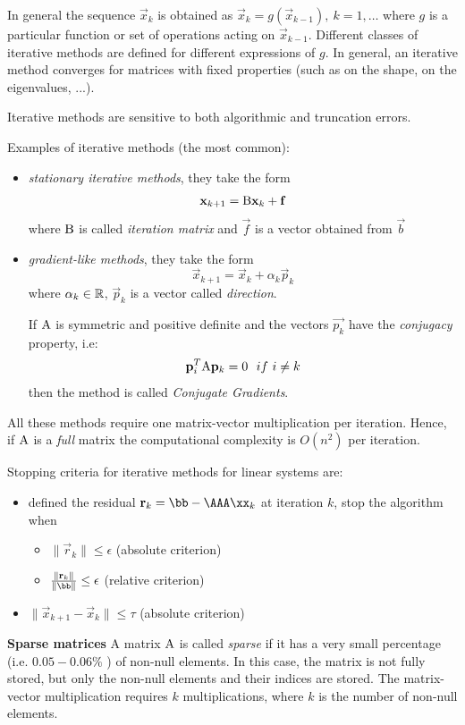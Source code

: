 In general the sequence $\vec{x}_k$ is obtained as $\vec{x}_k=g(\vec{x}_{k-1}), \ k=1,\ldots$ where $g$ is a particular function or set of operations acting on $\vec{x}_{k-1}$.
Different classes of iterative methods are defined for different expressions of $g$.
In general, an iterative method converges for matrices with fixed properties (such as on the shape, on the eigenvalues, ...).

Iterative methods are sensitive to both algorithmic and truncation errors.

Examples of iterative methods (the most common):

\begin{itemize}
    \item \textit{stationary iterative methods}, they take the form
    $$\mathbf{x}_{k+1} = \mathrm{B}\mathbf{x}_k + \mathbf{f}$$
    where $\mathrm{B}$ is called \textit{iteration matrix} and $\vec{f}$ is a vector obtained from $\vec{b}$
    \item \textit{gradient-like methods}, they take the form
    $$\vec{x}_{k+1} = \vec{x}_k + \alpha_k\vec{p}_k$$
    where $\alpha_k \in \mathbb{R}$, $\vec{p}_k$ is a vector called \textit{direction}.
    
    If $\mathrm{A}$ is symmetric and positive definite and the vectors $\vec{p_k}$ have the \textit{conjugacy} property, i.e:
    $$\mathbf{p}_i^T\mathrm{A}\mathbf{p}_k=0 \ \ if \ i \neq k $$
    then the method is called \textit{Conjugate Gradients}.
\end{itemize}

All these methods require one matrix-vector multiplication per iteration. Hence, if $\mathrm{A}$ is a \textit{full} matrix the computational complexity is $O(n^2)$ per iteration.

Stopping criteria for iterative methods for linear systems are:
\begin{itemize}
\item defined the residual $\vec{r}_k=\bb-\AAA\xx_k$ at iteration $k$, stop the algorithm when
\begin{itemize}
   \item $\|\vec{r}_k\| \le \epsilon$ (absolute criterion)
    \item $\frac{\|\vec{r}_k\|}{\|\bb\|} \le \epsilon$ (relative criterion)
    \end{itemize}
    \item $\|\vec{x}_{k+1}-\vec{x}_k\| \le \tau$ (absolute criterion)
\end{itemize}

\textbf{Sparse matrices}
A matrix $\mathrm{A}$ is called \textit{sparse} if it has a very small percentage (i.e. $0.05-0.06 \%$ ) of non-null elements. In this case, the matrix is not fully stored, but only the non-null elements and their indices are stored. The matrix-vector multiplication requires $k$ multiplications, where $k$ is the number of non-null elements.


